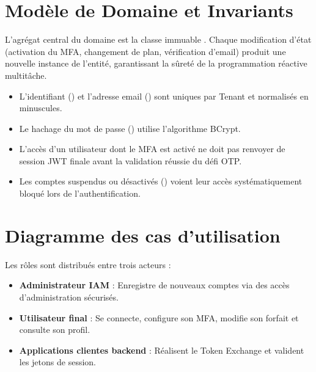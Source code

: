 \section{Modèle de Domaine et Invariants}
L'agrégat central du domaine est la classe immuable . Chaque modification d'état (activation du MFA, changement de plan, vérification d'email) produit une nouvelle instance de l'entité, garantissant la sûreté de la programmation réactive multitâche.

\begin{invbox}
\begin{itemize}
  \item L'identifiant () et l'adresse email () sont uniques par Tenant et normalisés en minuscules.
  \item Le hachage du mot de passe () utilise l'algorithme BCrypt.
  \item L'accès d'un utilisateur dont le MFA est activé ne doit pas renvoyer de session JWT finale avant la validation réussie du défi OTP.
  \item Les comptes suspendus ou désactivés () voient leur accès systématiquement bloqué lors de l'authentification.
\end{itemize}
\end{invbox}

\section{Diagramme des cas d'utilisation}
Les rôles sont distribués entre trois acteurs :
\begin{itemize}
  \item \textbf{Administrateur IAM} : Enregistre de nouveaux comptes via des accès d'administration sécurisés.
  \item \textbf{Utilisateur final} : Se connecte, configure son MFA, modifie son forfait et consulte son profil.
  \item \textbf{Applications clientes backend} : Réalisent le Token Exchange et valident les jetons de session.
\end{itemize}
